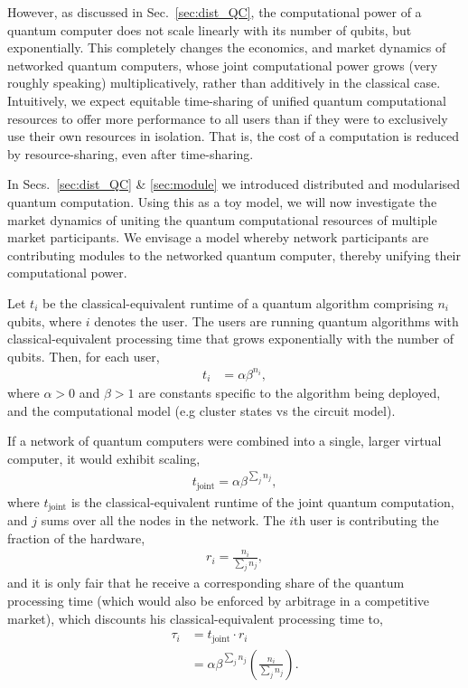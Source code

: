 \documentclass[aps,rmp,twocolumn,amsmath,amssymb,nofootinbib,superscriptaddress,longbibliography,floatfix,table-of-contents,eqsecnum]{revtex4-1}
\begin{document}
However, as discussed in Sec.~\ref{sec:dist_QC}, the computational power of a quantum computer does not scale linearly with its number of qubits, but exponentially. This completely changes the economics, and market dynamics of networked quantum computers, whose joint computational power grows (very roughly speaking) multiplicatively, rather than additively in the classical case. Intuitively, we expect equitable time-sharing of unified quantum computational resources to offer more performance to all users than if they were to exclusively use their own resources in isolation. That is, the cost of a computation is reduced by resource-sharing, even after time-sharing.

In Secs.~\ref{sec:dist_QC} \& \ref{sec:module} we introduced distributed and modularised quantum computation. Using this as a toy model, we will now investigate the market dynamics of uniting the quantum computational resources of multiple market participants. We envisage a model whereby network participants are contributing modules to the networked quantum computer, thereby unifying their computational power.

Let $t_i$ be the classical-equivalent runtime of a quantum algorithm comprising $n_i$ qubits, where $i$ denotes the user. The users are running quantum algorithms with classical-equivalent processing time that grows exponentially with the number of qubits. Then, for each user,
\begin{align}
t_i &= \alpha \beta^{n_i},
\end{align}
where \mbox{$\alpha>0$} and \mbox{$\beta>1$} are constants specific to the algorithm being deployed, and the computational model (e.g cluster states vs the circuit model).

If a network of quantum computers were combined into a single, larger virtual computer, it would exhibit scaling,
\begin{align}
t_\text{joint} = \alpha \beta^{\sum_j n_j},
\end{align}
where $t_\text{joint}$ is the classical-equivalent runtime of the joint quantum computation, and $j$ sums over all the nodes in the network. The $i$th user is contributing the fraction of the hardware,
\begin{align}
r_i=\frac{n_i}{\sum_j n_j},
\end{align}
and it is only fair that he receive a corresponding share of the quantum processing time (which would also be enforced by arbitrage in a competitive market), which discounts his classical-equivalent processing time to,
\begin{align}
\tau_i &= t_\text{joint} \cdot r_i \nonumber \\
&= \alpha \beta^{\sum_j n_j} \left(\frac{n_i}{\sum_j n_j}\right).
\end{align}
\end{document}
